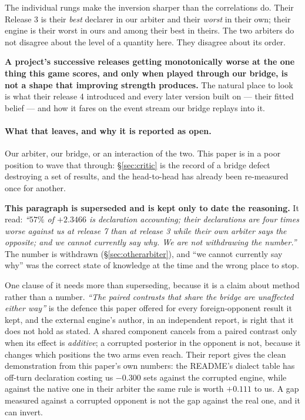 \documentclass[11pt,letterpaper]{article}
\begin{document}
The individual rungs make the inversion sharper than the correlations do. Their
Release 3 is their \emph{best} declarer in our arbiter and their \emph{worst} in
their own; their engine is their worst in ours and among their best in theirs.
The two arbiters do not disagree about the level of a quantity here. They
disagree about its order.

\textbf{A project's successive releases getting monotonically worse at the one
thing this game scores, and only when played through our bridge, is not a shape
that improving strength produces.} The natural place to look is what their release 4
introduced and every later version built on --- their fitted belief --- and how
it fares on the event stream our bridge replays into it.

\paragraph{What that leaves, and why it is reported as open.} Our arbiter, our
bridge, or an interaction of the two. This paper is in a poor position to wave
that through: \S\ref{sec:critic} is the record of a bridge defect destroying a
set of results, and the head-to-head has already been re-measured once for
another.

\textbf{This paragraph is superseded and is kept only to date the reasoning.}
It read: \emph{``$57\%$ of $+2.3466$ is declaration accounting; their
declarations are four times worse against us at release 7 than at release 3 while their
own arbiter says the opposite; and we cannot currently say why. We are not
withdrawing the number.''} The number is withdrawn (\S\ref{sec:otherarbiter}),
and ``we cannot currently say why'' was the correct state of knowledge at the
time and the wrong place to stop.

One clause of it needs more than superseding, because it is a claim about
method rather than a number. \emph{``The paired contrasts that share the bridge
are unaffected either way''} is the defence this paper offered for every
foreign-opponent result it kept, and the external engine's author, in an
independent report, is right that it does not hold as stated. A shared component cancels from a paired
contrast only when its effect is \emph{additive}; a corrupted posterior in the
opponent is not, because it changes which positions the two arms even reach.
Their report gives the clean demonstration from this paper's own numbers: the
README's dialect table has off-turn declaration costing us $-0.300$ sets
against the corrupted engine, while against the native one in their arbiter the
same rule is worth $+0.111$ to us. A gap measured against a corrupted opponent
is not the gap against the real one, and it can invert.
\end{document}
